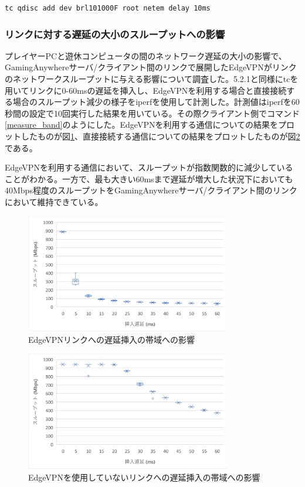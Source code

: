 \begin{lstlisting}[caption=遅延挿入,label=add_ratency]
    tc qdisc add dev brl101000F root netem delay 10ms
\end{lstlisting}

\subsubsection{リンクに対する遅延の大小のスループットへの影響}
プレイヤーPCと遊休コンピュータの間のネットワーク遅延の大小の影響で、GamingAnywhereサーバ/クライアント間のリンクで展開したEdgeVPNがリンクのネットワークスループットに与える影響について調査した。5.2.1と同様にtcを用いてリンクに0-60msの遅延を挿入し、EdgeVPNを利用する場合と直接接続する場合のスループット減少の様子をiperf\cite{iperf}を使用して計測した。計測値はiperfを60秒間の設定で10回実行した結果を用いている。その際クライアント側でコマンド\ref{measure_band}のようにした。EdgeVPNを利用する通信についての結果をプロットしたものが図\ref{fig:band_with_edge}、直接接続する通信についての結果をプロットしたものが図\ref{fig:band_without_edge}である。

EdgeVPNを利用する通信において、スループットが指数関数的に減少していることがわかる。一方で、最も大きい60msまで遅延が増大した状況下においても40Mbps程度のスループットをGamingAnywhereサーバ/クライアント間のリンクにおいて維持できている。

\begin{figure}[h!]
    \centering
    \includegraphics[width=0.8\textwidth,keepaspectratio,clip]{img/bandwidth_withEdgeVPN.pdf}
    \caption{EdgeVPNリンクへの遅延挿入の帯域への影響}
    \label{fig:band_with_edge}
\end{figure}

\begin{figure}[h!]
    \centering
    \includegraphics[width=0.8\textwidth,keepaspectratio,clip]{img/bandwidth_withoutEdgeVPN.pdf}
    \caption{EdgeVPNを使用していないリンクへの遅延挿入の帯域への影響}
    \label{fig:band_without_edge}
\end{figure}

